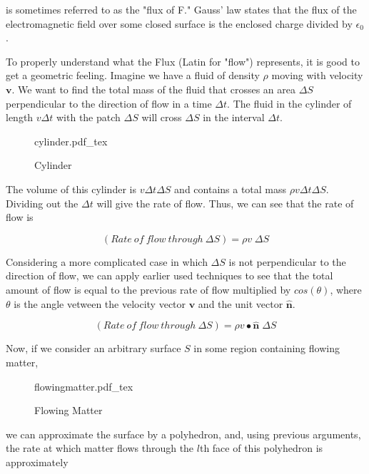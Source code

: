 \documentclass[11pt]{article}
\newcommand{\incfig}[2][1]{%
    \def\svgwidth{#1\columnwidth}
    {#2.pdf_tex}
}
\begin{document}
is sometimes referred to as the "flux of F." Gauss' law states that the flux of the electromagnetic field over some closed surface is the enclosed charge divided by $\epsilon_0$.

To properly understand what the Flux (Latin for "flow") represents, it is good to get a geometric feeling. Imagine we have a fluid of density $\rho$ moving with velocity $\mathbf{v}$. We want to find the total mass of the fluid that crosses an area $\Delta S$ perpendicular to the direction of flow in a time $\Delta t$. The fluid in the cylinder of length $v \Delta t$ with the patch $\Delta S$ will cross $\Delta S$ in the interval $\Delta t$.

\begin{figure}[ht]
    \centering
    \incfig{cylinder}
    \caption{Cylinder}
    \label{fig:cylinder}
\end{figure}

The volume of this cylinder is $v \Delta t \Delta S$ and contains a total mass $\rho v \Delta t \Delta S$. Dividing out the $\Delta t$ will give the rate of flow. Thus, we can see that the rate of flow is

\begin{equation}
	(Rate \: of \: flow \: through \: \Delta S) = \rho v \; \Delta S
\end{equation}

Considering a more complicated case in which $\Delta S$ is not perpendicular to the direction of flow, we can apply earlier used techniques to see that the total amount of flow is equal to the previous rate of flow multiplied by $cos(\theta)$, where $\theta$ is the angle vetween the velocity vector $\mathbf{v}$ and the unit vector $\mathbf{\hat{n}}$.

\begin{equation}
	(Rate \: of \: flow \: through \: \Delta S) = \rho v \bullet \mathbf{\hat{n}} \; \Delta S
\end{equation}

Now, if we consider an arbitrary surface $S$ in some region containing flowing matter,

\begin{figure}[ht]
    \centering
    \incfig{flowingmatter}
    \caption{Flowing Matter}
    \label{fig:flowingmatter}
\end{figure}

we can approximate the surface by a polyhedron, and, using previous arguments, the rate at which matter flows through the $l$th face of this polyhedron is approximately
\end{document}
